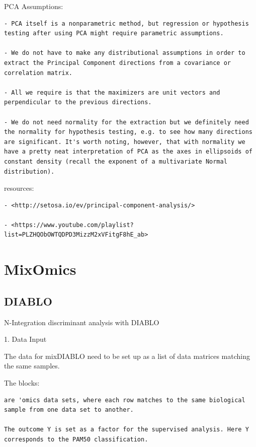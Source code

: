 \documentclass[
]{book}
\begin{document}
PCA Assumptions:

\begin{verbatim}
- PCA itself is a nonparametric method, but regression or hypothesis testing after using PCA might require parametric assumptions.

- We do not have to make any distributional assumptions in order to extract the Principal Component directions from a covariance or correlation matrix.

- All we require is that the maximizers are unit vectors and perpendicular to the previous directions.

- We do not need normality for the extraction but we definitely need the normality for hypothesis testing, e.g. to see how many directions are significant. It's worth noting, however, that with normality we have a pretty neat interpretation of PCA as the axes in ellipsoids of constant density (recall the exponent of a multivariate Normal distribution).
\end{verbatim}

resources:

\begin{verbatim}
- <http://setosa.io/ev/principal-component-analysis/>

- <https://www.youtube.com/playlist?list=PLZHQObOWTQDPD3MizzM2xVFitgF8hE_ab>
\end{verbatim}

\hypertarget{mixomics}{%
\section{MixOmics}\label{mixomics}}

\hypertarget{diablo}{%
\subsection{DIABLO}\label{diablo}}

N-Integration discriminant analysis with DIABLO

1. Data Input

The data for mixDIABLO need to be set up as a list of data matrices matching the same samples.

The blocks:

\begin{verbatim}
are 'omics data sets, where each row matches to the same biological sample from one data set to another.

The outcome Y is set as a factor for the supervised analysis. Here Y corresponds to the PAM50 classification.
\end{verbatim}
\end{document}
